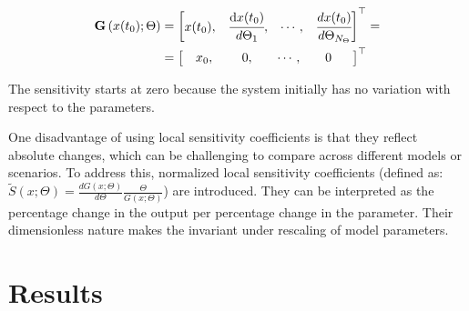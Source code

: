 \documentclass[a4paper,fleqn]{cas-dc}
\begin{document}
	{\footnotesize
		\begin{align}
			{\textbf{G}}\left(x(t_0);\Theta\right)  	   &= 
			\begin{bmatrix}
				x(t_0),						               &
				\cfrac{ \text{d}x(t_0) }{ d{\Theta_1} },   &
				\cdots,					 				   &
				\cfrac{ dx(t_0) }{ d{\Theta_{N_\Theta}} }            
			\end{bmatrix}^\top = \\ 					   &=
			\begin{bmatrix} 
				\quad x_0,	                               &
				\quad ~0,		                           &
				\quad \cdots,			                   &
				\quad 0 \quad~~
			\end{bmatrix}^\top \nonumber
	\end{align} }

	The sensitivity starts at zero because the system initially has no variation with respect to the parameters.
	
	One disadvantage of using local sensitivity coefficients is that they reflect absolute changes, which can be challenging to compare across different models or scenarios. To address this, normalized local sensitivity coefficients (defined as: $\tilde{S}(x;\Theta) = \frac{d G(x;\Theta)}{d\Theta} \frac{\Theta}{G(x;\Theta)}$) are introduced. They can be interpreted as the percentage change in the output per percentage change in the parameter. Their dimensionless nature makes the invariant under rescaling of model parameters.
	
	
	\section{Results} \label{CH: Results}
	
\end{document}
